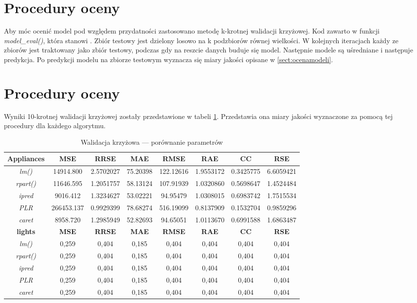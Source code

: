 \documentclass[a4paper,11pt,twoside]{mwrep}  %
\begin{document}
\section{Procedury oceny}\label{sect:proceduryOceny}
Aby móc ocenić model pod względem przydatności zastosowano metodę k-krotnej walidacji krzyżowej. Kod zawarto w funkcji \textit{model\_eval()}, która stanowi . Zbiór testowy jest dzielony losowo na k podzbiorów równej wielkości. W kolejnych iteracjach każdy ze zbiorów jest traktowany jako zbiór testowy, podczas gdy na reszcie danych buduje się model. Następnie modele są uśredniane i następuje predykcja. Po predykcji modelu na zbiorze testowym wyznacza się miary jakości opisane w \ref{sect:ocenamodeli}.      

\section{Procedury oceny}\label{sect:wyniki}
Wyniki 10-krotnej walidacji krzyżowej zostały przedstawione w tabeli \ref{table:wynikiKCV}. Przedstawia ona miary jakości wyznaczone za pomocą tej procedury dla każdego algorytmu.

\begin{table}[!h]  \centering
\caption{Walidacja krzyżowa --- porównanie parametrów}
\begin{tabular} { c  c  c  c  c  c  c  c} \hline \hline
    \textbf{Appliances} & \textbf{MSE} & \textbf{RRSE} & \textbf{MAE} & \textbf{RMSE} & \textbf{RAE} & \textbf{CC} & \textbf{RSE} \\ \hline
	\textit{lm()} & 14914.800 & 2.5702027	&  75.20398	& 122.12616	& 1.9553172	& 0.3425775 & 6.6059421 \\
	\textit{rpart()} & 11646.595 &	1.2051757	& 58.13124 & 107.91939 & 1.0320860	& 0.5698647 & 1.4524484 \\
	\textit{ipred} & 9016.412&	1.3234627&	53.02221&	94.95479&	1.0308015&	0.6983742&	1.7515534 \\
	\textit{PLR} & 266453.137	& 0.9929399 &	78.68274&	516.19099&	0.8137909&	0.1532704&	0.9859296 \\
	\textit{caret} & 8958.720& 	1.2985949&	52.82693&	94.65051&	1.0113670&	0.6991588&	1.6863487 \\
    \hline \hline
\textbf{lights} & \textbf{MSE} & \textbf{RRSE} & \textbf{MAE} & \textbf{RMSE} & \textbf{RAE} & \textbf{CC} & \textbf{RSE} \\ \hline
	\textit{lm()} & 0,259 & 0,404 & 0,185 & 0,404 & 0,404 & 0,404 & 0,404 \\
	\textit{rpart()} & 0,259 & 0,404 & 0,185 & 0,404 & 0,404 & 0,404 & 0,404 \\
	\textit{ipred} & 0,259 & 0,404 & 0,185 & 0,404 & 0,404 & 0,404 & 0,404 \\
	\textit{PLR} & 0,259 & 0,404 & 0,185 & 0,404 & 0,404 & 0,404 & 0,404 \\
	\textit{caret} & 0,259 & 0,404 & 0,185 & 0,404 & 0,404 & 0,404 & 0,404 \\
    
\end{tabular}
\label{table:wynikiKCV}
\end{table}
\end{document}
